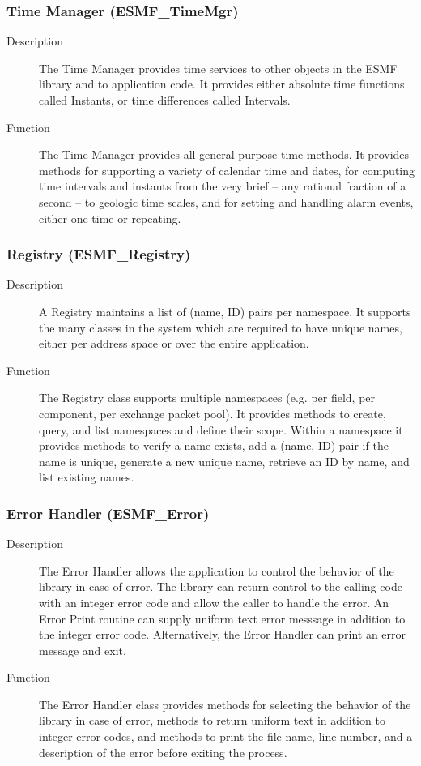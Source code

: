 \subsubsection{Time Manager (ESMF\_TimeMgr)}
\label{sec:timemgr} 
\begin{description}
\item [Description] The Time Manager provides time services to other objects
in the ESMF library and to application code.  It provides either absolute
time functions called Instants, or time differences called Intervals.
\item [Function] The Time Manager provides all general purpose time methods. 
It provides methods for supporting a variety of calendar time and dates,
for computing time intervals and instants from the very brief -- any 
rational fraction of a second -- to geologic time scales, and for
setting and handling alarm events, either one-time or repeating.
\end{description}

\subsubsection{Registry (ESMF\_Registry)}
\label{sec:registry} 
\begin{description}
\item [Description] A Registry maintains a list of (name, ID) pairs per 
namespace.  It supports the many classes in the system which are
required to have unique names, either per address space or over the entire
application.  
\item [Function] The Registry class supports multiple namespaces (e.g. per
field, per component, per exchange packet pool).  It provides methods to
create, query, and list namespaces and define their scope.  
Within a namespace it provides methods to
verify a name exists, add a (name, ID) pair if the name is unique,
generate a new unique name, retrieve an ID by name, and list existing names.
\end{description}

\subsubsection{Error Handler (ESMF\_Error)}
\label{sec:error} 
\begin{description}
\item [Description] The Error Handler allows the application to control 
the behavior of the library in case of error.  The library can return
control to the calling code with an integer error code and allow the
caller to handle the error.  An Error Print routine can
supply uniform text error messsage in addition to the integer error code.
Alternatively, the Error Handler can print an error message and exit.
\item [Function] The Error Handler class provides methods for selecting
the behavior of the library in case of error, methods to return uniform
text in addition to integer error codes, and methods to print the file
name, line number, and a description of the error before exiting the process.
\end{description}

